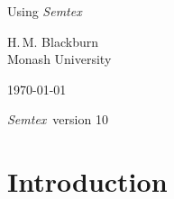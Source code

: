 \documentclass[11pt]{report}
\newcommand{\Semtex}{\emph{Semtex}} \newcommand{\Dog}{\emph{Dog}}
\begin{document}
\begin{titlepage}
\centering

\vspace*{\fill}

{\huge Using \Semtex}

\vspace{\fill}

\begin{figure}[h]
\begin{center}
\end{center}
\end{figure}

\vspace{\fill}

{\large H.\,M. Blackburn}\\
Monash University

\vspace{\fill}

\today

\Semtex\ version 10

\vspace*{\fill}

\end{titlepage}


\tableofcontents

\clearpage

\chapter{Introduction}
\label{ch.intro}
\end{document}
